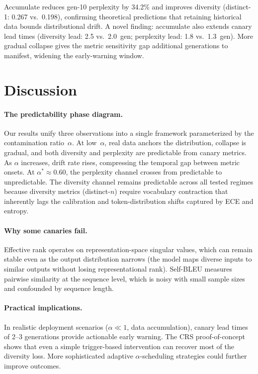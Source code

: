 \documentclass[letterpaper,11pt]{article}
\begin{document}
Accumulate reduces gen-10 perplexity by 34.2\% and improves diversity (distinct-1: 0.267 vs.\ 0.198), confirming theoretical predictions that retaining historical data bounds distributional drift. A novel finding: accumulate also extends canary lead times (diversity lead: 2.5 vs.\ 2.0~gen; perplexity lead: 1.8 vs.\ 1.3~gen). More gradual collapse gives the metric sensitivity gap additional generations to manifest, widening the early-warning window.

\section{Discussion}

\paragraph{The predictability phase diagram.}
Our results unify three observations into a single framework parameterized by the contamination ratio~$\alpha$. At low~$\alpha$, real data anchors the distribution, collapse is gradual, and both diversity and perplexity are predictable from canary metrics. As $\alpha$ increases, drift rate rises, compressing the temporal gap between metric onsets. At $\alpha^* \approx 0.60$, the perplexity channel crosses from predictable to unpredictable. The diversity channel remains predictable across all tested regimes because diversity metrics (distinct-$n$) require vocabulary contraction that inherently lags the calibration and token-distribution shifts captured by ECE and entropy.

\paragraph{Why some canaries fail.}
Effective rank operates on representation-space singular values, which can remain stable even as the output distribution narrows (the model maps diverse inputs to similar outputs without losing representational rank). Self-BLEU measures pairwise similarity at the sequence level, which is noisy with small sample sizes and confounded by sequence length.

\paragraph{Practical implications.}
In realistic deployment scenarios ($\alpha \ll 1$, data accumulation), canary lead times of 2--3 generations provide actionable early warning. The CRS proof-of-concept shows that even a simple trigger-based intervention can recover most of the diversity loss. More sophisticated adaptive $\alpha$-scheduling strategies could further improve outcomes.
\end{document}
